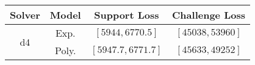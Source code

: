 \begin{tabular}{cc|c|c} 
\hline 
 Solver & Model & Support Loss  & Challenge Loss \tabularnewline\hline 
\hline 
\multirow{2}{*}{d4} & Exp. & $\left[5944,6770.5\right]$ & $\left[45038,53960\right]$ \tabularnewline 
 & Poly. & $\left[5947.7,6771.7\right]$ & $\left[45633,49252\right]$ \tabularnewline 
\hline 
\end{tabular} 

